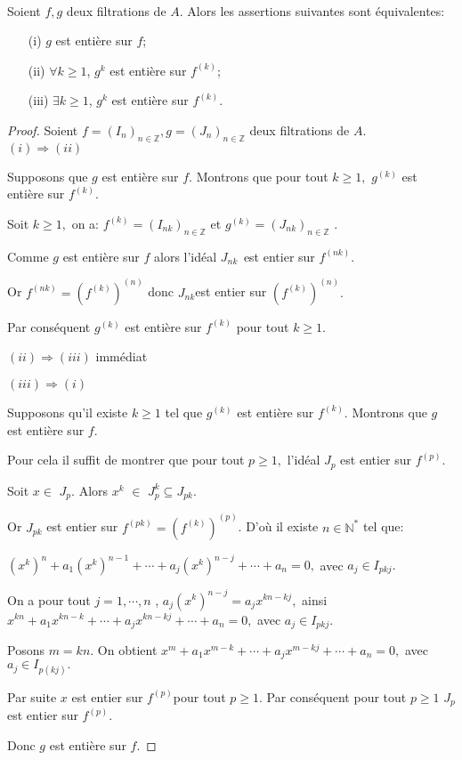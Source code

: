 \begin{maproposition} \cite{Di2} \\
	Soient $f,g$ deux filtrations de $A$. Alors les assertions suivantes sont équivalentes:
	\begin{enumerate}
		\item[(i)] $g$ est entière sur $f$;
		\item[(ii)] $\forall k \geqslant 1$, $g^{k}$ est entière sur $f^{(k)}$;
		\item[(iii)] $\exists k \geqslant 1$, $g^{k}$ est entière sur $f^{(k)}$.
	\end{enumerate}
\end{maproposition}
\begin{proof}
	Soient $f=(I_n)_{n \in \mathbb{Z}},g=(J_n)_{n \in \mathbb{Z}}$ deux filtrations de $A$. \\
	$(i)\Longrightarrow (ii)$
	
	Supposons que $g$ est entière sur $f.$ Montrons que pour tout $k\geq 1,$ $g^{(k)}$ est entière sur $f^{(k)}.$
	
	Soit $k\geq 1,$ on a: $f^{(k)}=(I_{nk})_{n\in \mathbb{Z}}$ et $g^{(k)}=(J_{nk})_{n\in \mathbb{Z}}$ .
	
	Comme $g$ est entière sur $f$ alors l'idéal $J_{nk\text{ }}$est entier sur $f^{(nk)}.$
	
	Or $f^{(nk)}=(f^{(k)})^{(n)}$ donc $J_{nk}$est entier sur $(f^{(k)})^{(n)}.$
	
	Par conséquent $g^{(k)}$ est entière sur $f^{(k)}$ pour tout $k\geq 1.$
	
	$(ii)\Longrightarrow (iii)$ immédiat
	
	$(iii)\Longrightarrow (i)$
	
	Supposons qu'il existe $k\geq 1$ tel que $g^{(k)}$ est entière sur $f^{(k)}$. Montrons que $g$ est entière sur $f.$
	
	Pour cela il suffit de montrer que pour tout $p\geq 1,$ l'idéal $J_{p}$ est entier sur $f^{(p)}.$
	
	Soit $x\in $ $J_{p}.$ Alors $x^{k}$ $\in $ $J_{p}^{k}\subseteq J_{pk}.$
	
	Or $J_{pk}$ est entier sur $f^{(pk)}=(f^{(k)})^{(p)}$. D'où il existe $n\in \mathbb{N}^{\ast }$ tel que:
	
	$(x^{k})^{n}+a_{1}(x^{k})^{n-1}+\cdots +a_{j}(x^{k})^{n-j}+\cdots +a_{n}=0,$ avec $a_{j}\in I_{pkj}.$
	
	On a pour tout $j=1,\cdots ,n$ , $a_{j}(x^{k})^{n-j}=a_{j}x^{kn-kj},$ ainsi $x^{kn}+a_{1}x^{kn-k}+\cdots +a_{j}x^{kn-kj}+\cdots +a_{n}=0,$ avec $a_{j}\in I_{pkj}.$
	
	Posons $m=kn.$ On obtient $x^{m}+a_{1}x^{m-k}+\cdots +a_{j}x^{m-kj}+\cdots +a_{n}=0,$ avec $a_{j}\in I_{p(kj)}.$
	
	Par suite $x$ est entier sur $f^{(p)}$pour tout $p\geq 1.$ Par conséquent pour tout $p\geq 1$ $J_{p}$ est entier sur $f^{(p)}.$
	
	Donc $g$ est entière sur $f.$
	
\end{proof}

